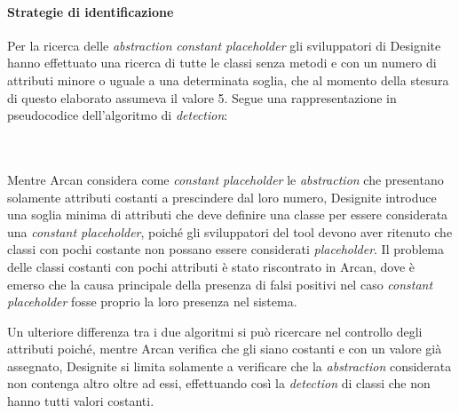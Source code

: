     \paragraph{Strategie di identificazione}
        Per la ricerca delle \textit{abstraction} \textit{constant placeholder} gli sviluppatori di Designite hanno effettuato una ricerca di tutte le classi senza metodi e con un numero di attributi minore o uguale a una determinata soglia, che al momento della stesura di questo elaborato assumeva il valore 5. 
        Segue una rappresentazione in pseudocodice dell'algoritmo di \textit{detection}:
        \begin{algorithmic}
                    \EndIf
                \EndIf
            \EndFunction
        \end{algorithmic}
         \\
        \\
        Mentre Arcan considera come \textit{constant placeholder} le \textit{abstraction} che presentano solamente attributi costanti a prescindere dal loro numero, Designite introduce una soglia minima di attributi che deve definire una classe per essere considerata una \textit{constant placeholder}, poiché gli sviluppatori del tool devono aver ritenuto che classi con pochi costante non possano essere considerati \textit{placeholder}. Il problema delle classi costanti con pochi attributi è stato riscontrato in Arcan, dove è emerso che la causa principale della presenza di falsi positivi nel caso \textit{constant placeholder} fosse proprio la loro presenza nel sistema.
        
        Un ulteriore differenza tra i due algoritmi si può ricercare nel controllo degli attributi poiché, mentre Arcan verifica che gli siano costanti e con un valore già assegnato, Designite si limita solamente a verificare che la \textit{abstraction} considerata non contenga altro oltre ad essi, effettuando così la \textit{detection} di classi che non hanno tutti valori costanti.
         
